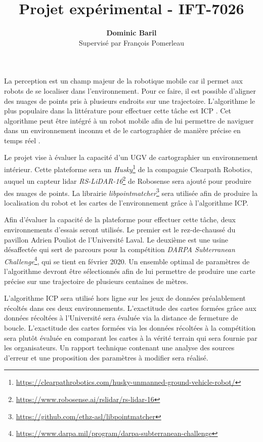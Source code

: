 \documentclass[12pt]{article}
\title{\vspace{-2.0cm} Projet expérimental - IFT-7026}
\author{\textbf{Dominic Baril} \\ \small Supervisé par François Pomerleau}
\date{\vspace{-5ex}}
\begin{document}
    \maketitle
     La perception est un champ majeur de la robotique mobile car il permet aux robots de se localiser dans l'environnement.
     Pour ce faire, il est possible d'aligner des nuages de points pris à plusieurs endroits sur une trajectoire. 
     L'algorithme le plus populaire dans la littérature pour effectuer cette tâche est \ac{ICP} \cite{Chen1991}. 
     Cet algorithme peut être intégré à un robot mobile afin de lui permettre de naviguer dans un environnement inconnu et de le cartographier de manière précise en temps réel \cite{Pomerleau2013, Pomerleau2015}. 
     
     \bigskip
     
     Le projet vise à évaluer la capacité d'un \ac{UGV} de cartographier un environnement intérieur.
     Cette plateforme sera un \textit{Husky}\footnote{\url{https://clearpathrobotics.com/husky-unmanned-ground-vehicle-robot/}} de la compagnie Clearpath Robotics, auquel un capteur lidar \textit{RS-LiDAR-16}\footnote{\url{https://www.robosense.ai/rslidar/rs-lidar-16}} de Robosense sera ajouté pour produire des nuages de points. 
     La librairie \textit{libpointmatcher}\footnote{\url{https://github.com/ethz-asl/libpointmatcher}} sera utilisée afin de produire la localisation du robot et les cartes de l'environnement grâce à l'algorithme \ac{ICP}. 
     
     
     \bigskip
     
     Afin d'évaluer la capacité de la plateforme pour effectuer cette tâche, deux environnements d'essais seront utilisés. 
     Le premier est le rez-de-chaussé du pavillon Adrien Pouliot de l'Université Laval. 
     Le deuxième est une usine désaffectée qui sert de parcours pour la compétition \textit{DARPA Subterranean Challenge}\footnote{\url{https://www.darpa.mil/program/darpa-subterranean-challenge}}, qui se tient en février 2020.
     Un ensemble optimal de paramètres de l'algorithme devront être sélectionnés afin de lui permettre de produire une carte précise sur une trajectoire de plusieurs centaines de mètres.
     
     \bigskip
     
     L'algorithme ICP sera utilisé hors ligne sur les jeux de données préalablement récoltés dans ces deux environnements. 
     L'exactitude des cartes formées grâce aux données récoltées à l'Université sera évaluée via la distance de fermeture de boucle.
     L'exactitude des cartes formées via les données récoltées à la compétition sera plutôt évaluée en comparant les cartes à la vérité terrain qui sera fournie par les organisateurs.
     Un rapport technique contenant une analyse des sources d'erreur et une proposition des paramètres à modifier sera réalisé.
     
     \newpage
     \printbibliography[title=Références]
    
\end{document}
